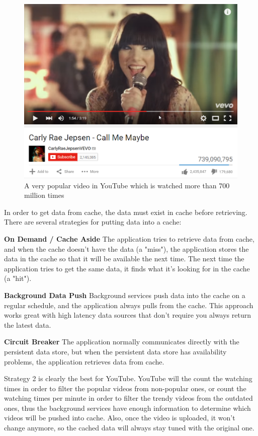 \begin{figure}[H]
	\centering
	\includegraphics[width=\linewidth]{CallMeMaybe.png}
	\caption{A very popular video in YouTube which is watched more than 700 million times}
\end{figure}

In order to get data from cache, the data must exist in cache before retrieving. There are several strategies for putting data into a cache:

\textbf{On Demand / Cache Aside} The application tries to retrieve data from cache, and when the cache doesn't have the data (a "miss"), the application stores the data in the cache so that it will be available the next time. The next time the application tries to get the same data, it finds what it's looking for in the cache (a "hit").

\textbf{Background Data Push} Background services push data into the cache on a regular schedule, and the application always pulls from the cache. This approach works great with high latency data sources that don't require you always return the latest data.

\textbf{Circuit Breaker} The application normally communicates directly with the persistent data store, but when the persistent data store has availability problems, the application retrieves data from cache.

Strategy 2 is clearly the best for YouTube. YouTube will the count the watching times in order to filter the popular videos from non-popular ones, or count the watching times per minute in order to filter the trendy videos from the outdated ones, thus the background services have enough information to determine which videos will be pushed into cache. Also, once the video is uploaded, it won't change anymore, so the cached data will always stay tuned with the original one.

